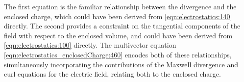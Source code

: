 The first equation is the familiar relationship between the divergence and the enclosed charge, which could have been derived from \cref{eqn:electrostatics:140} directly.
The second provides a constraint on the tangential components of the field with respect to the enclosed volume, and could have been derived from
\cref{eqn:electrostatics:100} directly.
The multivector equation \cref{eqn:electrostatics_enclosedCharge:460} encodes both of these relationships, simultaneously incorporating the contributions of the Maxwell divergence and curl equations for the electric field, relating both to the enclosed charge.

